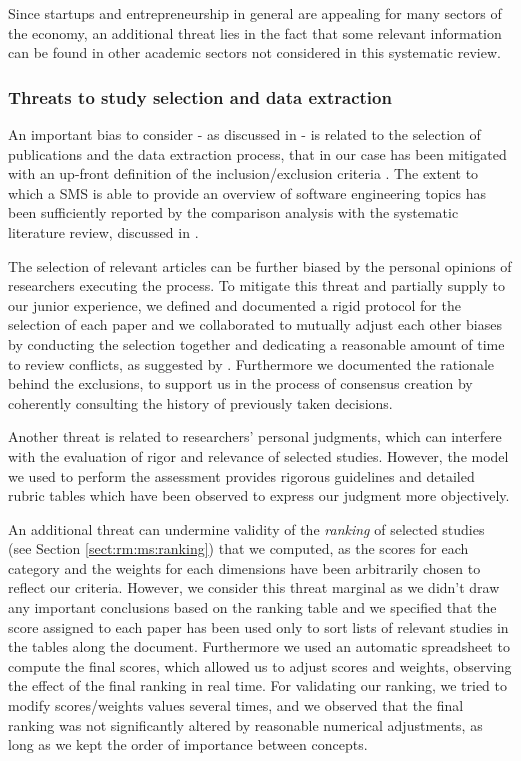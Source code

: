 \documentclass[final,5p,times,twocolumn]{elsarticle}
\begin{document}
Since startups and entrepreneurship in general are appealing for many sectors of the economy, an additional threat lies in the fact that some relevant information can be found in other academic sectors not considered in this systematic review.
\subsubsection{Threats to study selection and data extraction}
\label{sect:rm:ms:validity:sele}

An important bias to consider - as discussed in \cite{Dyba2008} - is related to the selection of publications and the data extraction process, that in our case has been mitigated with an up-front definition of the inclusion/exclusion criteria \cite{Kitchenham2007}. The extent to which a SMS is able to provide an overview of software engineering topics has been sufficiently reported by the comparison analysis with the systematic literature review, discussed in \cite{Petersen2007}.

The selection of relevant articles can be further biased by the personal opinions of researchers executing the process. To mitigate this threat and partially supply to our junior experience, we defined and documented a rigid protocol for the selection of each paper and we collaborated to mutually adjust each other biases by conducting the selection together and dedicating a reasonable amount of time to review conflicts, as suggested by \cite{Kitchenham2007}. Furthermore we documented the rationale behind the exclusions, to support us in the process of consensus creation by coherently consulting the history of previously taken decisions.

Another threat is related to researchers’ personal judgments, which can interfere with the evaluation of rigor and relevance of selected studies. However, the model we used to perform the assessment \cite{Ivarsson2010} provides rigorous guidelines and detailed rubric tables which have been observed to express our judgment more objectively.

An additional threat can undermine validity of the \textit{ranking} of selected studies (see Section \ref{sect:rm:ms:ranking}) that we computed, as the scores for each category and the weights for each dimensions have been arbitrarily chosen to reflect our criteria. However, we consider this threat marginal as we didn’t draw any important conclusions based on the ranking table and we specified that the score assigned to each paper has been used only to sort lists of relevant studies in the tables along the document. Furthermore we used an automatic spreadsheet to compute the final scores, which allowed us to adjust scores and weights, observing the effect of the final ranking in real time. For validating our ranking, we tried to modify scores/weights values several times, and we observed that the final ranking was not significantly altered by reasonable numerical adjustments, as long as we kept the order of importance between concepts.
\end{document}
